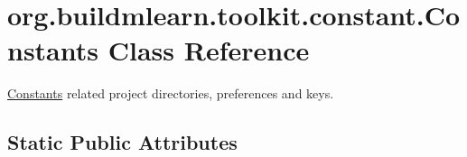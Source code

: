 \hypertarget{classorg_1_1buildmlearn_1_1toolkit_1_1constant_1_1Constants}{}\section{org.\+buildmlearn.\+toolkit.\+constant.\+Constants Class Reference}
\label{classorg_1_1buildmlearn_1_1toolkit_1_1constant_1_1Constants}


\hyperlink{classorg_1_1buildmlearn_1_1toolkit_1_1constant_1_1Constants}{Constants} related project directories, preferences and keys.  


\subsection*{Static Public Attributes}
